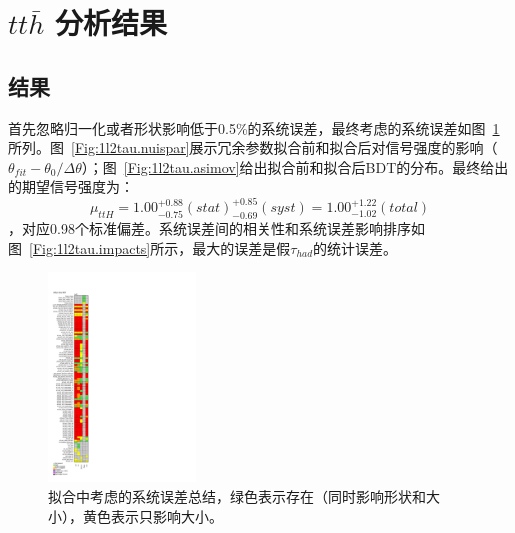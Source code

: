 \section{$tt\bar{h}$ 分析结果}\label{sec:ttH_results}
\subsection{\ltwotau 结果}
首先忽略归一化或者形状影响低于0.5\%的系统误差，最终考虑的系统误差如图~\ref{Fig:1l2tau.pruning}所列。图~\ref{Fig:1l2tau.nuispar}展示冗余参数拟合前和拟合后对信号强度的影响（$\theta_{fit}-\theta_{0}/\Delta\theta$）；图~\ref{Fig:1l2tau.asimov}给出拟合前和拟合后BDT的分布。最终给出的期望信号强度为：$$\mu_{ttH}=1.00^{+0.88}_{-0.75}(stat)^{+0.85}_{-0.69}(syst)=1.00^{+1.22}_{-1.02}(total)$$，对应0.98个标准偏差。系统误差间的相关性和系统误差影响排序如图~\ref{Fig:1l2tau.impacts}所示，最大的误差是假$\tau_{had}$的统计误差。

\begin{figure}[htbp]
\centering
\begin{center}
\includegraphics[width=0.35\textwidth, height=0.8\textheight]{fig/OneLepTwoTaus/Pruning.pdf}
\end{center}
\caption{\ltwotau 拟合中考虑的系统误差总结，绿色表示存在（同时影响形状和大小），黄色表示只影响大小。}
\label{Fig:1l2tau.pruning}
\end{figure}

